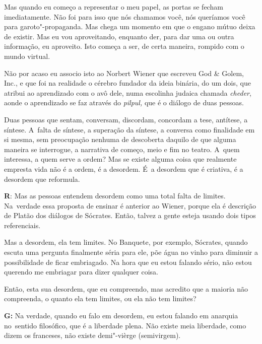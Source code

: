  

Mas quando eu começo a representar o meu papel, as portas se fecham
imediatamente. Não foi para isso que nós chamamos você, nós queríamos
você para garoto"-propaganda. Mas chega um momento em que o engano mútuo
deixa de existir. Mas eu vou aproveitando, enquanto der, para dar uma ou
outra informação, eu aproveito. Isto começa a ser, de certa maneira,
rompido com o mundo virtual.

 

Não por acaso eu associo isto ao Norbert Wiener que escreveu God \&
Golem, Inc., e que foi na realidade o cérebro fundador da ideia binária,
do um dois, que atribui ao aprendizado com o avô dele, numa escolinha
judaica chamada \emph{cheder}, aonde o aprendizado se faz através do
\emph{pilpul,} que é o diálogo de duas pessoas.

 

Duas pessoas que sentam, conversam, discordam, concordam a tese,
antítese, a síntese. A~falta de síntese, a superação da síntese, a
conversa como finalidade em si mesma, sem preocupação nenhuma de
descoberta daquilo de que alguma maneira se interrogue, a narrativa de
começo, meio e fim no teatro. A~quem interessa, a quem serve a ordem?
Mas se existe alguma coisa que realmente empresta vida não é a ordem, é
a desordem. É~a desordem que é criativa, é a desordem que reformula.

 

\textbf{R}: Mas as pessoas entendem desordem como uma total falta de
limites. Na\textbf{}~verdade essa proposta de ensinar é anterior ao
Wiener, porque ela é descrição de Platão dos diálogos de Sócrates. Então,
talvez a gente esteja usando dois tipos referenciais.

 

Mas a desordem, ela tem limites. No Banquete, por exemplo, Sócrates,
quando escuta uma pergunta finalmente séria para ele, põe água no vinho
para diminuir a possibilidade de ficar embriagado. Na hora que eu estou
falando sério, não estou querendo me embriagar para dizer qualquer
coisa.

 

Então, esta sua desordem, que eu compreendo, mas acredito que a maioria
não compreenda, o quanto ela tem limites, ou ela não tem limites?

 

\textbf{G:} Na verdade, quando eu falo em desordem, eu estou falando em
anarquia no\textbf{}~sentido filosófico, que é a liberdade plena. Não
existe meia liberdade, como dizem os franceses, não existe demi"-vièrge
(semivirgem).

